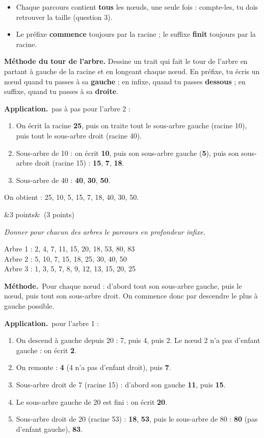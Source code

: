 \documentclass[11pt, a4paper]{exam}
\newcommand{\Q}[3]{\par\needspace{5\baselineskip}\bigskip\noindent{\large\bfseries Question #1}\ifx&#2&\else\ \textnormal{(#2)}\fi\par\nopagebreak\smallskip\noindent\textit{#3}\par\nopagebreak\smallskip}
\newcommand{\methode}{\par\noindent\textbf{Méthode.}\ }
\newcommand{\application}{\par\noindent\textbf{Application.}\ }
\begin{document}
\begin{retenir}
\begin{itemize}
\item Chaque parcours contient \textbf{tous} les nœuds, une seule fois : compte-les, tu dois retrouver la taille (question 3).
\item Le préfixe \textbf{commence} toujours par la racine ; le suffixe \textbf{finit} toujours par la racine.
\end{itemize}
\end{retenir}

\textbf{Méthode du tour de l'arbre.} Dessine un trait qui fait le tour de l'arbre en partant à gauche de la racine et en longeant chaque nœud. En préfixe, tu écris un nœud quand tu passes à sa \textbf{gauche} ; en infixe, quand tu passes \textbf{dessous} ; en suffixe, quand tu passes à sa \textbf{droite}.

\application pas à pas pour l'arbre 2 :
\begin{enumerate}
\item On écrit la racine \textbf{25}, puis on traite tout le sous-arbre gauche (racine 10), puis tout le sous-arbre droit (racine 40).
\item Sous-arbre de 10 : on écrit \textbf{10}, puis son sous-arbre gauche (\textbf{5}), puis son sous-arbre droit (racine 15) : \textbf{15}, \textbf{7}, \textbf{18}.
\item Sous-arbre de 40 : \textbf{40}, \textbf{30}, \textbf{50}.
\end{enumerate}
On obtient : 25, 10, 5, 15, 7, 18, 40, 30, 50.

\Q{9}{3 points}{Donner pour chacun des arbres le parcours en profondeur infixe.}
\begin{reponse}
Arbre 1 : 2, 4, 7, 11, 15, 20, 18, 53, 80, 83 \\
Arbre 2 : 5, 10, 7, 15, 18, 25, 30, 40, 50 \\
Arbre 3 : 1, 3, 5, 7, 8, 9, 12, 13, 15, 20, 25
\end{reponse}
\methode Pour chaque nœud : d'abord tout son sous-arbre gauche, puis le nœud, puis tout son sous-arbre droit. On commence donc par descendre le plus à gauche possible.

\application pour l'arbre 1 :
\begin{enumerate}
\item On descend à gauche depuis 20 : 7, puis 4, puis 2. Le nœud 2 n'a pas d'enfant gauche : on écrit \textbf{2}.
\item On remonte : \textbf{4} (4 n'a pas d'enfant droit), puis \textbf{7}.
\item Sous-arbre droit de 7 (racine 15) : d'abord son gauche \textbf{11}, puis \textbf{15}.
\item Le sous-arbre gauche de 20 est fini : on écrit \textbf{20}.
\item Sous-arbre droit de 20 (racine 53) : \textbf{18}, \textbf{53}, puis le sous-arbre de 80 : \textbf{80} (pas d'enfant gauche), \textbf{83}.
\end{enumerate}
\end{document}
